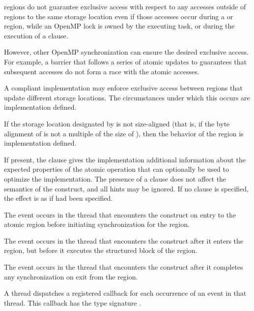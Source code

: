  regions do not guarantee exclusive access with respect to any accesses outside
of  regions to the same storage location  even if those accesses occur during a
 or  region, while an OpenMP lock is owned by the executing
task, or during the execution of a  clause.

However, other OpenMP synchronization can ensure the desired exclusive access. For
example, a barrier that follows a series of atomic updates to  guarantees 
that subsequent accesses do not form a race with the atomic accesses.

A compliant implementation may enforce exclusive access between  regions
that update different storage locations. The circumstances under which this occurs are
implementation defined.

If the storage location designated by  is not size-aligned (that is, if the byte alignment
of  is not a multiple of the size of ), then the behavior of the  region is
implementation defined.

If present, the  clause gives the implementation additional
information about the expected properties of the atomic operation
that can optionally be used to optimize the implementation.
The presence of a  clause does not affect the semantics of
the  construct, and all hints may be ignored. If no  
clause is specified, the effect is as if  
had been specified.

\events
The  event occurs in the thread that encounters the
 construct on entry to the atomic region before
initiating synchronization for the region.

The  event occurs in the thread that encounters the
 construct after it enters the region, but before it executes 
the structured block of the  region.

The  event occurs in the thread that encounters the
 construct after it completes any synchronization on exit 
from the  region.

\tools

A thread dispatches a registered 
callback for each occurrence of an  event
in that thread. This callback has the type signature 
.

